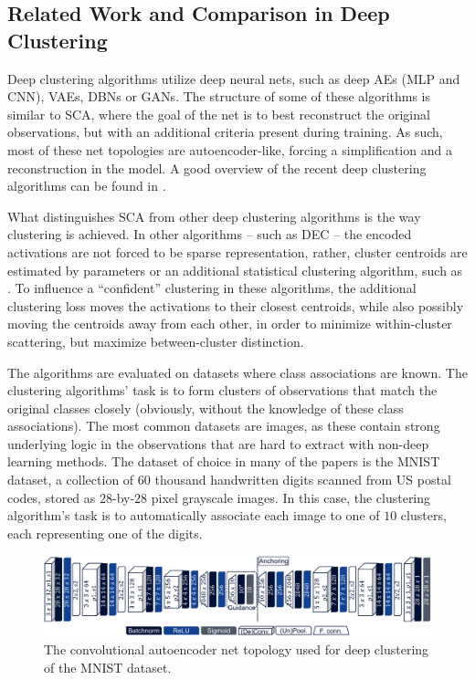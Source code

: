 		\subsection{Related Work and Comparison in Deep Clustering}
			
			Deep clustering algorithms utilize deep neural nets, such as deep \acp{AE} (\ac{MLP} and \ac{CNN}), \acp{VAE}, \acp{DBN} or \acp{GAN}.
			The structure of some of these algorithms is similar to \ac{SCA}, where the goal of the net is to best reconstruct the original observations, but with an additional criteria present during training.
			As such, most of these net topologies are autoencoder-like, forcing a simplification and a reconstruction in the model.
			A good overview of the recent deep clustering algorithms can be found in \cite{aljalbout2018clustering}.
			
			What distinguishes \ac{SCA} from other deep clustering algorithms is the way clustering is achieved.
			In other algorithms -- such as  \ac{DEC} -- the encoded activations are not forced to be sparse representation, rather, cluster centroids are estimated by parameters or an additional statistical clustering algorithm, such as \kmeans{}.
			To influence a ``confident'' clustering in these algorithms, the additional clustering loss moves the activations to their closest centroids, while also possibly moving the centroids away from each other, in order to minimize within-cluster scattering, but maximize between-cluster distinction.
			
			The algorithms are evaluated on datasets where class associations are known.
			The clustering algorithms' task is to form clusters of observations that match the original classes closely (obviously, without the knowledge of these class associations).
			The most common datasets are images, as these contain strong underlying logic in the observations that are hard to extract with non-deep learning methods.
			The dataset of choice in many of the papers is the MNIST dataset, a collection of $60$ thousand handwritten digits scanned from US postal codes, stored as $28$-by-$28$ pixel grayscale images.
			In this case, the clustering algorithm's task is to automatically associate each image to one of $10$ clusters, each representing one of the digits.
			
			\begin{figure}[ht]
				\centering
				\includegraphics[width=\linewidth]{figures/06_sparse_clust/topology_conv/topology_conv.pdf}
				\caption[CNN AE topology used for MNIST in the SCA evaluation]{The convolutional autoencoder net topology used for deep clustering of the MNIST dataset.}
				\label{fig:topology_conv}
			\end{figure}
			
